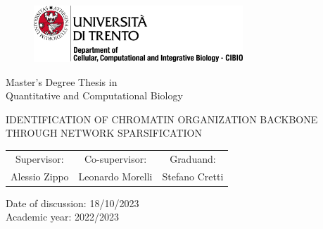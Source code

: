 \graphicspath{{chapters/00_title_page/images/}}

\pagestyle{empty}

\begin{center}
  
  \vspace*{1 cm}
  \begin{figure}[h]
    \centering
    \includegraphics[width=0.7\textwidth]{logo_unitn.png}
  \end{figure}
  \vspace{2 cm}

  \LARGE{Master's Degree Thesis in\\Quantitative and Computational Biology\\}  

  \vspace{2 cm}
  \LARGE\textsc{IDENTIFICATION OF CHROMATIN ORGANIZATION BACKBONE THROUGH NETWORK SPARSIFICATION\\}
  \vspace{2 cm}

  \begin{tabular}{c@{\hskip 2cm}c@{\hskip 2cm}c}
    Supervisor: & Co-supervisor: & Graduand: \\
    Alessio Zippo & Leonardo Morelli & Stefano Cretti
  \end{tabular}

  \vspace{6 cm}

\end{center}

\begin{flushleft}
  \LARGE{Date of discussion: 18/10/2023}\\
  \vspace{0.5 cm}
  \LARGE{Academic year: 2022/2023}\\
\end{flushleft}

\maketitle

